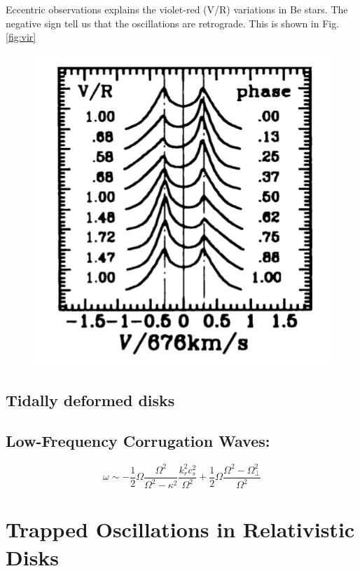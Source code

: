 Eccentric observations explains the violet-red (V/R) variations in
Be stars.
The negative sign tell us that the oscillations are retrograde.
This is shown in Fig.\ref{fig:vir}

\begin{figure}\label{fig:vr}
\centering
\includegraphics[scale=0.4]{VRBestars.png}
\end{figure}

\subsection*{Tidally deformed disks}


\subsection*{Low-Frequency Corrugation Waves:}

\begin{equation}
\omega \sim -\dfrac{1}{2} \Omega \dfrac{\Omega^2}{\Omega^2 -
\kappa^2} \dfrac{k_r^2 c_s^2 }{\Omega^2} + \dfrac{1}{2} \Omega
\dfrac{\Omega^2 - \Omega_{\bot}^2}{\Omega^2}
\end{equation}


\section*{Trapped Oscillations in Relativistic Disks}


